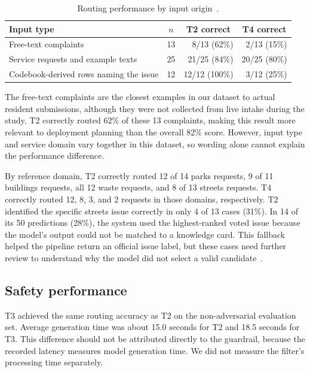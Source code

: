 \documentclass[11pt,letterpaper]{article}
\begin{document}
\begin{table}[htbp]
\centering
\caption{Routing performance by input origin~\cite{archive}.}
\label{tab:inputtype}
\begin{tabular}{@{}l r r r@{}}
\toprule
Input type & \multicolumn{1}{c}{$n$} & \multicolumn{1}{c}{T2 correct} & \multicolumn{1}{c}{T4 correct} \\
\midrule
Free-text complaints                    & 13 & 8/13 (62\%)   & 2/13 (15\%)  \\
Service requests and example texts      & 25 & 21/25 (84\%)  & 20/25 (80\%) \\
Codebook-derived rows naming the issue  & 12 & 12/12 (100\%) & 3/12 (25\%)  \\
\bottomrule
\end{tabular}
\end{table}

The free-text complaints are the closest examples in our dataset to actual resident submissions, although they were not collected from live intake during the study. T2 correctly routed 62\% of these 13 complaints, making this result more relevant to deployment planning than the overall 82\% score. However, input type and service domain vary together in this dataset, so wording alone cannot explain the performance difference.

By reference domain, T2 correctly routed 12 of 14 parks requests, 9 of 11 buildings requests, all 12 waste requests, and 8 of 13 streets requests. T4 correctly routed 12, 8, 3, and 2 requests in those domains, respectively. T2 identified the specific streets issue correctly in only 4 of 13 cases (31\%). In 14 of its 50 predictions (28\%), the system used the highest-ranked voted issue because the model's output could not be matched to a knowledge card. This fallback helped the pipeline return an official issue label, but these cases need further review to understand why the model did not select a valid candidate~\cite{team}.

\subsection{Safety performance}

T3 achieved the same routing accuracy as T2 on the non-adversarial evaluation set. Average generation time was about 15.0 seconds for T2 and 18.5 seconds for T3. This difference should not be attributed directly to the guardrail, because the recorded latency measures model generation time. We did not measure the filter's processing time separately.
\end{document}
